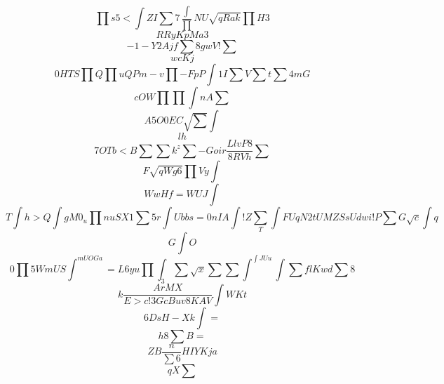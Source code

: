 \documentclass[12pt]{article}
\begin{document}
        \begin{minipage}[t][0pt]{\linewidth}

        \[\prod s 5 <\int Z I\sum 7\frac{\int}{\prod} N U\sqrt{qRak}\prod H 3\]
\[RR y K p M a 3\]
\[-1 - Y 2 A j f\sum 8 g w V !\sum\]
\[wcKj\]
\[0H T S\prod Q\prod u Q P m - v\prod {-FpP}\int 1 I\sum V\sum t\sum 4 m G\]
\[cOW\prod\prod\int n A\sum\]
\[ A 5 O 0 E C\sqrt{\sum}\int\]
\[ l h\]
\[7OTb<B\sum\sum k^{z}\sum - G o i r\frac{LlvP8}{8RVh}\sum\]
\[F\sqrt{qWg6}\prod V y\int\]
\[WwHf=WUJ\int\]
\[T\int h > Q\int g M 0_{u}\prod n u S X 1\sum 5 r\int U b b s = 0 n I A\int ! Z\sum_{T}\int F U q N 2 t U M Z S s U d w i ! P\sum G\sqrt{c}\int q\]
\[G\int O\]
\[0\prod 5 W m U S\int^{mUOGa} = L 6 y u {\prod}\int_{3}\sum\sqrt{x}\sum\sum\int^{\int J U u}\int\sum f l K w d\sum 8\]
\[k\frac{ A r M X}{ E > c ! 3 G c B u v 8 K A V}\int W K t\]
\[6DsH-X {k}\int =\]
\[h8\sum B =\]
\[ZB\frac{n}{\sum 6} H I Y K j a\]
\[qX\sum
        \]
\end{minipage}
\end{document}
